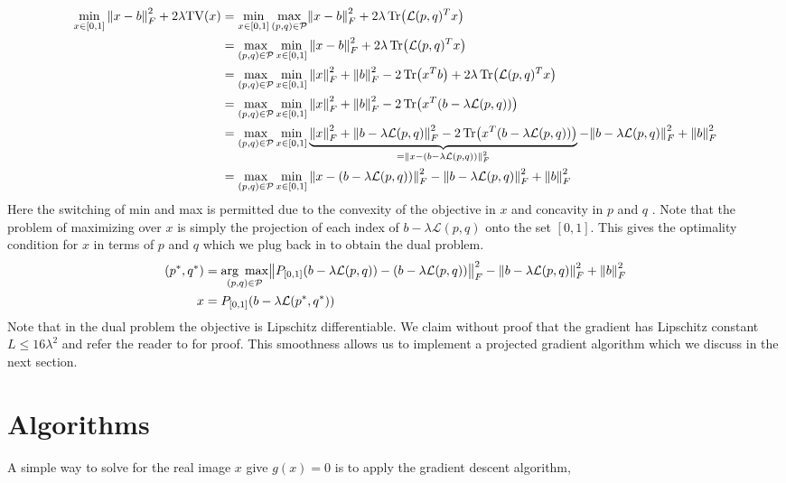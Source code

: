 \documentclass[10pt,a4paper]{article}
\begin{document}
\begin{align*}
\min_{x \in [0,1]} \norm{x-b}_F^2 +2 \lambda \mathrm{TV}(x) &= \min_{x \in [0,1]}  \underset{(p,q) \in \mathcal{P}}{\max}  \norm{x-b}_F^2 + 2\lambda \Tr(\mathcal{L}(p,q)^Tx) \\
&= \underset{(p,q) \in \mathcal{P}}{\max}   \min_{x \in [0,1]} \norm{x-b}_F^2 +2 \lambda \Tr(\mathcal{L}(p,q)^Tx) \\
&=\underset{(p,q) \in \mathcal{P}}{\max}   \min_{x \in [0,1]} \norm{x}_F^2 + \norm{b}_F^2 - 2 \Tr(x^Tb)+ 2\lambda \Tr(\mathcal{L}(p,q)^Tx) \\
&=\underset{(p,q) \in \mathcal{P}}{\max}   \min_{x \in [0,1]} \norm{x}_F^2 + \norm{b}_F^2 - 2 \Tr(x^T(b- \lambda\mathcal{L}(p,q)))\\
&=\underset{(p,q) \in \mathcal{P}}{\max}   \min_{x \in [0,1]} \underbrace{\norm{x}_F^2 + \norm{b- \lambda\mathcal{L}(p,q)}_F^2 - 2 \Tr(x^T(b- \lambda\mathcal{L}(p,q)))}_{ = \norm{x-(b- \lambda\mathcal{L}(p,q))}_F^2} -  \norm{b- \lambda\mathcal{L}(p,q)}_F^2+ \norm{b}_F^2\\
&= \underset{(p,q) \in \mathcal{P}}{\max}   \min_{x \in [0,1]}  \norm{x-(b- \lambda\mathcal{L}(p,q))}_F^2 - \norm{b- \lambda\mathcal{L}(p,q)}_F^2+ \norm{b}_F^2
\end{align*}
Here the switching of min and max is permitted due to the convexity of the objective in $x$ and concavity in $p$ and $q$ \cite{TV}.  Note that the problem of maximizing over $x$ is simply the projection of each index of  $b- \lambda\mathcal{L}(p,q)$ onto the set $[0,1]$.  This gives the optimality condition for $x$ in terms of $p$ and $q$ which we plug back in to obtain the dual problem.
\begin{align*}
(p^*,q^*) &= \underset{(p,q) \in \mathcal{P}}{\text{arg }\max}  \norm{P_{[0,1]}(b- \lambda\mathcal{L}(p,q)) -(b- \lambda\mathcal{L}(p,q))}_F^2 - \norm{b- \lambda\mathcal{L}(p,q)}_F^2+ \norm{b}_F^2\\
x &= P_{[0,1]}(b- \lambda\mathcal{L}(p^*,q^*))
\end{align*}
Note that in the dual problem the objective is Lipschitz differentiable.  We claim without proof that the gradient has Lipschitz constant $L \leq 16 \lambda^2$ and refer the reader to \cite{TV} for proof.  This smoothness allows us to implement a projected gradient algorithm which we discuss in the next section.

\section{Algorithms}
A simple way to solve for the real image $x$ give $g(x) = 0$ is to apply the gradient descent algorithm,
\end{document}
